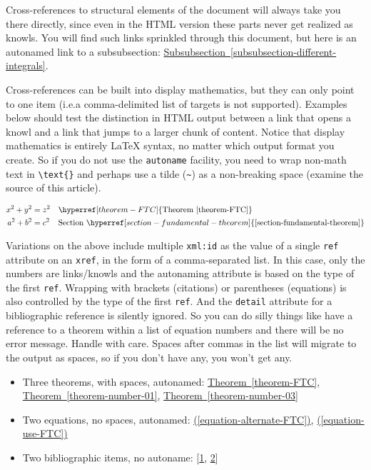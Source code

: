\documentclass[10pt,]{article}
\theoremstyle{plain}
\theoremstyle{definition}
\theoremstyle{definition}
\theoremstyle{definition}
\theoremstyle{definition}
\theoremstyle{definition}
\theoremstyle{definition}
\numberwithin{equation}{section}
\begin{document}
%
\par
\hypertarget{p-576}{}%
Cross-references to structural elements of the document will always take you there directly, since even in the HTML version these parts never get realized as knowls.  You will find such links sprinkled through this document, but here is an autonamed link to a subsubsection:  \hyperref[subsubsection-different-integrals]{Subsubsection~\ref{subsubsection-different-integrals}}.%
\par
\hypertarget{p-577}{}%
Cross-references can be built into display mathematics, but they can only point to one item (i.e.\@ a comma-delimited list of targets is not supported).  Examples below should test the distinction in HTML output between a link that opens a knowl and a link that jumps to a larger chunk of content.  Notice that display mathematics is entirely \LaTeX{} syntax, no matter which output format you create.  So if you do not use the \lstinline?autoname? facility, you need to wrap non-math text in \lstinline?\text{}? and perhaps use a tilde (\lstinline?~?) as a non-breaking space (examine the source of this article).%
\par
\hypertarget{p-578}{}%
%
\begin{align*}
x^2 + y^2 &= z^2&&\hyperref[theorem-FTC]{\text{Theorem~\ref{theorem-FTC}}}\\
a^2 + b^2 &= c^2&&\text{Section}~\hyperref[section-fundamental-theorem]{\text{\ref{section-fundamental-theorem}}}
\end{align*}
%
\par
\hypertarget{p-579}{}%
Variations on the above include multiple \lstinline?xml:id? as the value of a single \lstinline?ref? attribute on an \lstinline?xref?, in the form of a comma-separated list.  In this case, only the numbers are links/knowls and the autonaming attribute is based on the type of the first \lstinline?ref?.  Wrapping with brackets (citations) or parentheses (equations) is also controlled by the type of the first \lstinline?ref?.  And the \lstinline?detail? attribute for a bibliographic reference is silently ignored.  So you can do silly things like have a reference to a theorem within a list of equation numbers and there will be no error message.  Handle with care.  Spaces after commas in the list will migrate to the output as spaces, so if you don't have any, you won't get any.\leavevmode%
\begin{itemize}[label=\textbullet]
\item{}\hypertarget{p-580}{}%
Three theorems, with spaces, autonamed: \hyperref[theorem-FTC]{Theorem~\ref{theorem-FTC}}, \hyperref[theorem-number-01]{Theorem~\ref{theorem-number-01}}, \hyperref[theorem-number-03]{Theorem~\ref{theorem-number-03}}%
\item{}\hypertarget{p-581}{}%
Two equations, no spaces, autonamed: \hyperref[equation-alternate-FTC]{(\ref{equation-alternate-FTC})}, \hyperref[equation-use-FTC]{(\ref{equation-use-FTC})}%
\item{}\hypertarget{p-582}{}%
Two bibliographic items, no autoname: [\hyperlink{biblio-judson-AATA}{1}, \hyperlink{biblio-lay-article}{2}]%
\end{itemize}
\end{document}
